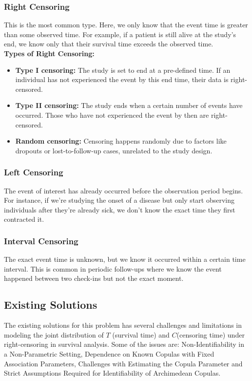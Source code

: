 \subsubsection{Right Censoring}
This is the most common type. Here, we only know that the event time is greater than some observed time. For example, if a patient is still alive at the study’s end, we know only that their survival time exceeds the observed time.\\
\textbf{Types of Right Censoring:}
\begin{itemize}
	\item \textbf{Type I censoring:} The study is set to end at a pre-defined time. If an individual has not experienced the event by this end time, their data is right-censored.
	\item \textbf{Type II censoring:} The study ends when a certain number of events have occurred. Those who have not experienced the event by then are right-censored.
	\item \textbf{Random censoring:} Censoring happens randomly due to factors like dropouts or lost-to-follow-up cases, unrelated to the study design.
\end{itemize}

\subsubsection{Left Censoring}
The event of interest has already occurred before the observation period begins. For instance, if we’re studying the onset of a disease but only start observing individuals after they’re already sick, we don’t know the exact time they first contracted it.

\subsubsection{Interval Censoring}
The exact event time is unknown, but we know it occurred within a certain time interval. This is common in periodic follow-ups where we know the event happened between two check-ins but not the exact moment.

\subsection{Existing Solutions}
The existing solutions for this problem has several challenges and limitations in modeling the joint distribution of  $T$  (survival time) and  $C$(censoring time) under right-censoring in survival analysis.
Some of the issues are: Non-Identifiability in a Non-Parametric Setting\cite{3}, Dependence on Known Copulas with Fixed Association Parameters\cite{4}, Challenges with Estimating the Copula Parameter\cite{2} and Strict Assumptions Required for Identifiability of Archimedean Copulas\cite{1}.


